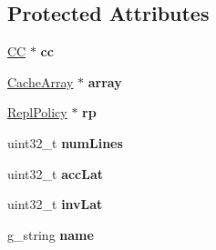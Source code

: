 \subsection*{Protected Attributes}
\begin{DoxyCompactItemize}
\item 
\hypertarget{classCache_a06050894ede6b3d3e1e680582d90836c}{\hyperlink{classCC}{C\-C} $\ast$ {\bfseries cc}}\label{classCache_a06050894ede6b3d3e1e680582d90836c}

\item 
\hypertarget{classCache_a665c740f827fe6aa2ea4cab71de9d08a}{\hyperlink{classCacheArray}{Cache\-Array} $\ast$ {\bfseries array}}\label{classCache_a665c740f827fe6aa2ea4cab71de9d08a}

\item 
\hypertarget{classCache_a56d08e92e2bf7301402b03e333cd458b}{\hyperlink{classReplPolicy}{Repl\-Policy} $\ast$ {\bfseries rp}}\label{classCache_a56d08e92e2bf7301402b03e333cd458b}

\item 
\hypertarget{classCache_a0d43aadafe65c0753c8656f315e27a8d}{uint32\-\_\-t {\bfseries num\-Lines}}\label{classCache_a0d43aadafe65c0753c8656f315e27a8d}

\item 
\hypertarget{classCache_acec1448a346c8ebf5412d4ba0d8f0645}{uint32\-\_\-t {\bfseries acc\-Lat}}\label{classCache_acec1448a346c8ebf5412d4ba0d8f0645}

\item 
\hypertarget{classCache_adeafa997d10220f79e5cf85c1c3ab46e}{uint32\-\_\-t {\bfseries inv\-Lat}}\label{classCache_adeafa997d10220f79e5cf85c1c3ab46e}

\item 
\hypertarget{classCache_a85342a02c0ac63167a48b6792e13e8d9}{g\-\_\-string {\bfseries name}}\label{classCache_a85342a02c0ac63167a48b6792e13e8d9}

\end{DoxyCompactItemize}



